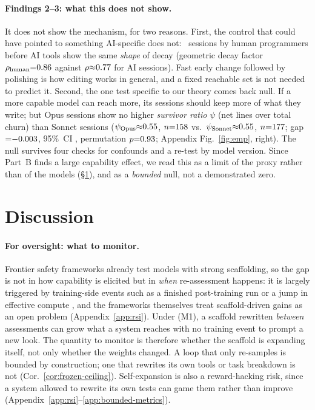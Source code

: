 \documentclass{article}
\theoremstyle{remark}
\theoremstyle{plain}
\begin{document}
\paragraph{Findings 2--3: what this does not show.} It does not show the mechanism, for two reasons. First, the control that could have pointed to something AI-specific does not: \statPCCtrlSessions\ sessions by human programmers before AI tools show the same \emph{shape} of decay (geometric decay factor $\rho_{\mathrm{human}}{=}0.86$ against $\rho{\approx}0.77$ for AI sessions). Fast early change followed by polishing is how editing works in general, and a fixed reachable set is not needed to predict it. Second, the one test specific to our theory comes back null. If a more capable model can reach more, its sessions should keep more of what they write; but Opus sessions show no higher \emph{survivor ratio} $\psi$ (net lines over total churn) than Sonnet sessions ($\psi_{\mathrm{Opus}}{\approx}0.55$, $n{=}158$ vs.\ $\psi_{\mathrm{Sonnet}}{\approx}0.55$, $n{=}177$; gap${=}{-}0.003$, 95\%~CI \statPCGapCI, permutation $p{=}0.93$; Appendix Fig.~\ref{fig:emp}, right). The null survives four checks for confounds and a re-test by model version. Since Part~B finds a large capability effect, we read this as a limit of the proxy rather than of the models (\S\ref{sec:discussion}), and as a \emph{bounded} null, not a demonstrated zero.

\section{Discussion}
\label{sec:discussion}

\paragraph{For oversight: what to monitor.} Frontier safety frameworks already test models with strong scaffolding, so the gap is not in how capability is elicited but in \emph{when} re-assessment happens: it is largely triggered by training-side events such as a finished post-training run or a jump in effective compute \citep{anthropic2026rsp, deepmind2026fsf, openai2025preparedness}, and the frameworks themselves treat scaffold-driven gains as an open problem (Appendix~\ref{app:rsi}). Under (M1), a scaffold rewritten \emph{between} assessments can grow what a system reaches with no training event to prompt a new look. The quantity to monitor is therefore whether the scaffold is expanding itself, not only whether the weights changed. A loop that only re-samples is bounded by construction; one that rewrites its own tools or task breakdown is not (Cor.~\ref{cor:frozen-ceiling}). Self-expansion is also a reward-hacking risk, since a system allowed to rewrite its own tests can game them rather than improve (Appendix~\ref{app:rsi}--\ref{app:bounded-metrics}).
\end{document}
